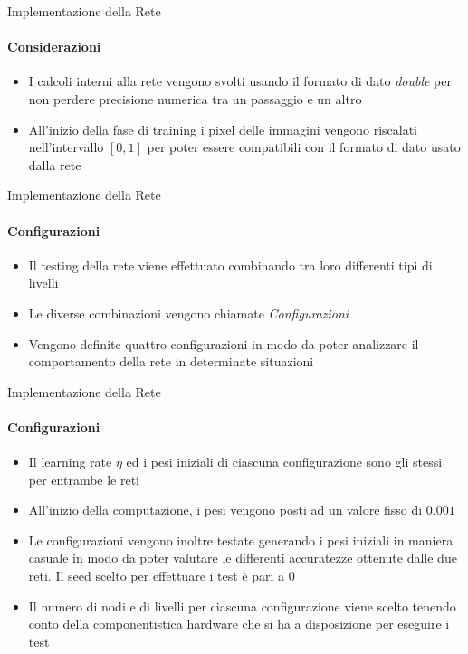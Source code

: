 \documentclass[
 ]{beamer}
\begin{document}
\begin{frame}{Implementazione della Rete}
    \framesubtitle{Considerazioni}
    \begin{itemize} [<+->]
        \setlength\itemsep{1.5em}
        \item \large I calcoli interni alla rete vengono svolti usando il formato di dato \emph{double} per non perdere precisione numerica tra un passaggio e un altro
        \item \large All'inizio della fase di training i pixel delle immagini vengono riscalati nell'intervallo $[0,1]$ per poter essere compatibili con il formato di dato usato dalla rete 
    \end{itemize} 
    
\end{frame}

\begin{frame}{Implementazione della Rete}
    \framesubtitle{Configurazioni}
    \smallskip
    \begin{itemize} [<+->]
        \setlength\itemsep{2em}
        \item \large Il testing della rete viene effettuato combinando tra loro differenti tipi di livelli
        \item \large Le diverse combinazioni vengono chiamate \emph{Configurazioni}
        \item \large Vengono definite quattro configurazioni in modo da poter analizzare il comportamento della rete in determinate situazioni
    \end{itemize}     
\end{frame}

\begin{frame}{Implementazione della Rete}
    \framesubtitle{Configurazioni}
    \smallskip
    \begin{itemize} [<+->]
        \setlength\itemsep{1em}
        \item \large Il learning rate $\eta$ ed i pesi iniziali di ciascuna configurazione sono gli stessi per entrambe le reti 
        \item \large All'inizio della computazione, i pesi vengono posti ad un valore fisso di $0.001$ 
        \item \large Le configurazioni vengono inoltre testate generando i pesi iniziali in maniera casuale in modo da poter valutare le differenti accuratezze ottenute dalle due reti. Il seed scelto per effettuare i test è pari a $0$
        \item \large Il numero di nodi e di livelli per ciascuna configurazione viene scelto tenendo conto della componentistica hardware che si ha a disposizione per eseguire i test
    \end{itemize}     
\end{frame}
\end{document}
